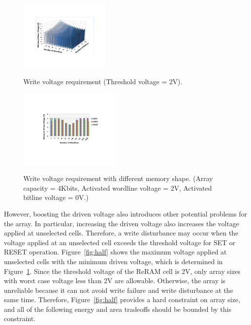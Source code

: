 \begin{figure}%
\centering
  \includegraphics[width=0.4\textwidth]{./figures/worst_v_f.pdf}\\
  \caption{Write voltage requirement (Threshold voltage = 2V). }\label{fig:worst_v}
  \vspace{-10pt}
\end{figure}


\begin{figure}%
\centering
  \includegraphics[width=0.45\textwidth]{./figures/shape_f.pdf}\\
  \caption{Write voltage requirement with different memory shape. (Array capacity = 4Kbits, Activated wordline voltage = 2V, Activated bitline voltage = 0V.)}\label{fig:shape}
    \vspace{-10pt}
\end{figure}

However, boosting the driven voltage also introduces other potential problems for the array. In particular, increasing the driven voltage also increases the voltage applied at unselected cells. Therefore, a
write disturbance may occur when the voltage applied at an unselected cell exceeds the threshold voltage for SET or RESET operation. Figure~\ref{fig:half} shows the maximum voltage applied at
unselected cells with the minimum driven voltage, which is determined in
Figure~\ref{fig:worst_v}. Since the threshold voltage of the ReRAM cell is 2V, only array sizes with worst case voltage less than 2V are allowable. Otherwise, the array is unreliable because it can not avoid write failure and write disturbance at the same time. Therefore, Figure~\ref{fig:half} provides a hard constraint on array size, and all of the following energy and area tradeoffs should be bounded by this constraint.

